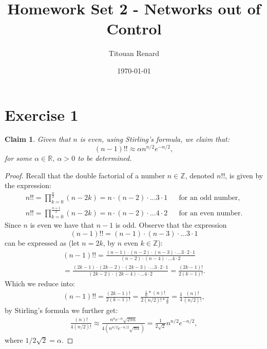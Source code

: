 \documentclass[11pt]{article}
\title{Homework Set 2 - Networks out of Control}
\date{\today}
\author{Titouan Renard}
\newtheorem{claim}{Claim}
\begin{document}
\maketitle	

\section*{Exercise 1}


\begin{claim}
    Given that $n$ is even, using Stirling's formula, we claim that:
    \[ (n-1)!! \approx \alpha n^{n/2}e^{-n/2}, \]
    for some $\alpha \in \mathbb{R},~\alpha>0$ to be determined.
\end{claim}

\begin{proof}
    Recall that the double factorial of a number $n \in \mathbb{Z}$, denoted $n!!$, is given by the expression: 
    \begin{align*}
        n!! = \prod_{k=0}^{\frac{n}{2}} (n-2k) = n \cdot (n-2)  \cdot ... 3 \cdot 1 && \text{for an odd number,} \\
        n!! = \prod_{k=0}^{\frac{n+1}{2}} (n-2k) = n \cdot (n-2)  \cdot ... 4 \cdot 2 && \text{for an even number.} 
    \end{align*}
    Since $n$ is even we have that $n-1$ is odd. Observe that the expression
    \[ (n-1)!! = (n-1) \cdot (n-3)  \cdot ... 3 \cdot 1 \]
    can be expressed as (let $n=2k$, by $n$ even $k\in\mathbb{Z}$): 
    \begin{align*}
        (n-1)!! = \frac{(n-1) \cdot (n-2) \cdot (n-3) \cdot ... 3 \cdot 2 \cdot 1}{(n-2) \cdot (n-4) \cdot ... 4 \cdot 2} \\
        = \frac{(2k-1) \cdot (2k-2) \cdot (2k-3) \cdot ... 3 \cdot 2 \cdot 1}{(2k-2) \cdot (2k-4) \cdot ... 4 \cdot 2} = \frac{(2k-1)!}{2(k-1)!}.
    \end{align*}
    Which we reduce into:
    \begin{align*}
        (n-1)!! =  \frac{(2k-1)!}{2(k-1)!} = \frac{\frac{1}{n}*(n)!}{2(n/2)!*\frac{2}{n}} = \frac{1}{4} \frac{(n)!}{(n/2)!},
    \end{align*}
    by Stirling's formula we further get:
    \begin{align*}
        \frac{(n)!}{4(n/2)!} \approx  \frac{n^{n} e^{-n} \sqrt{2 \pi n}}{4(n^{n/2} e^{-n/2} \sqrt{\pi n})} = \frac{1}{2\sqrt{2}}n^{n/2}e^{-n/2},
    \end{align*}
    where $1/2\sqrt{2} = \alpha$.
\end{proof}
\end{document}
